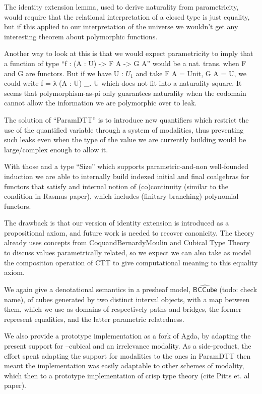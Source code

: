 \documentclass{book}
\begin{document}
\begin{itemize}
\begin{itemize}
    The identity extension lemma, used to derive naturality from
    parametricity, would require that the relational interpretation of
    a closed type is just equality, but if this applied to our
    interpretation of the universe we wouldn't get any interesting
    theorem about polymorphic functions.

    Another way to look at this is that we would expect parametricity
    to imply that a function of type ``f : (A : U) -> F A -> G A''
    would be a nat. trans. when F and G are functors.  But if we have
    U : $U_1$ and take F A = Unit, G A = U, we could write
    f = λ (A : U) \_. U which does not fit into a naturality square.
    It seems that polymorphism-as-pi only guarantees naturality when
    the codomain cannot allow the information we are polymorphic over
    to leak.

    The solution of ``ParamDTT'' is to introduce new quantifiers which
    restrict the use of the quantified variable through a system of
    modalities, thus preventing such leaks even when the type of the
    value we are currently building would be large/complex enough to
    allow it.

    With those and a type ``Size'' which supports parametric-and-non
    well-founded induction we are able to internally build indexed
    initial and final coalgebras for functors that satisfy and
    internal notion of (co)continuity (similar to the condition in
    Rasmus paper), which includes (finitary-branching) polynomial
    functors.

    The drawback is that our version of identity extension is
    introduced as a propositional axiom, and future work is needed to
    recover canonicity. The theory already uses concepts from
    CoquandBernardyMoulin and Cubical Type Theory to discuss values
    parametrically related, so we expect we can also take as model the
    composition operation of CTT to give computational meaning to this
    equality axiom.

    We again give a denotational semantics in a presheaf model,
    $\hat{\mathsf{BCCube}}$ (todo: check name), of cubes generated by two distinct interval
    objects, with a map between them, which we use as domains of
    respectively paths and bridges, the former represent equalities,
    and the latter parametric relatedness.

    We also provide a prototype implementation as a fork of Agda, by
    adapting the present support for --cubical and an irrelevance
    modality. As a side-product, the effort spent adapting the support
    for modalities to the ones in ParamDTT then meant the
    implementation was easily adaptable to other schemes of modality,
    which then to a prototype implementation of crisp type theory
    (cite Pitts et. al paper).
    \end{itemize}
    

\end{itemize}
\end{document}
